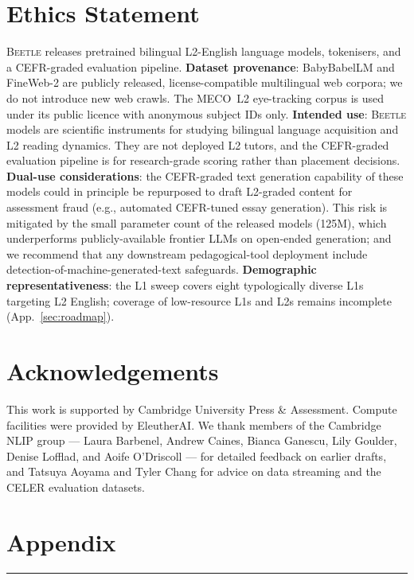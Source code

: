 \documentclass[11pt]{article}
\begin{document}
\section{Ethics Statement}\label{sec:ethics}

\textsc{Beetle} releases pretrained bilingual L2-English language models, tokenisers, and a CEFR-graded evaluation pipeline. \textbf{Dataset provenance}: BabyBabelLM and FineWeb-2 are publicly released, license-compatible multilingual web corpora; we do not introduce new web crawls. The MECO~L2 eye-tracking corpus is used under its public licence with anonymous subject IDs only. \textbf{Intended use}: \textsc{Beetle} models are scientific instruments for studying bilingual language acquisition and L2 reading dynamics. They are not deployed L2 tutors, and the CEFR-graded evaluation pipeline is for research-grade scoring rather than placement decisions. \textbf{Dual-use considerations}: the CEFR-graded text generation capability of these models could in principle be repurposed to draft L2-graded content for assessment fraud (e.g., automated CEFR-tuned essay generation). This risk is mitigated by the small parameter count of the released models (125M), which underperforms publicly-available frontier LLMs on open-ended generation; and we recommend that any downstream pedagogical-tool deployment include detection-of-machine-generated-text safeguards. \textbf{Demographic representativeness}: the L1 sweep covers eight typologically diverse L1s targeting L2 English; coverage of low-resource L1s and L2s remains incomplete (App.~\ref{sec:roadmap}).


\section{Acknowledgements}
This work is supported by Cambridge University Press \& Assessment. Compute facilities were provided by EleutherAI. We thank members of the Cambridge NLIP group --- Laura Barbenel, Andrew Caines, Bianca Ganescu, Lily Goulder, Denise Lofflad, and Aoife O'Driscoll --- for detailed feedback on earlier drafts, and Tatsuya Aoyama and Tyler Chang for advice on data streaming and the CELER evaluation datasets.


\onecolumn
\appendix
\section*{Appendix}
\noindent\rule{\linewidth}{0.4pt}
\end{document}
